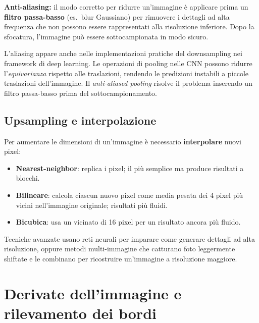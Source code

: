 \documentclass[12pt, a4paper]{report}
\begin{document}
\textbf{Anti-aliasing:} il modo corretto per ridurre un'immagine è applicare prima
un \textbf{filtro passa-basso} (es.\ blur Gaussiano) per rimuovere i dettagli ad
alta frequenza che non possono essere rappresentati alla risoluzione inferiore.  Dopo
la sfocatura, l'immagine può essere sottocampionata in modo sicuro.

\begin{notebox}
L'aliasing appare anche nelle implementazioni pratiche del downsampling nei framework
di deep learning.  Le operazioni di pooling nelle CNN possono ridurre
l'\emph{equivarianza} rispetto alle traslazioni, rendendo le predizioni instabili a
piccole traslazioni dell'immagine.  Il \emph{anti-aliased pooling} risolve il
problema inserendo un filtro passa-basso prima del sottocampionamento.
\end{notebox}

\subsection{Upsampling e interpolazione}

Per aumentare le dimensioni di un'immagine è necessario \textbf{interpolare} nuovi
pixel:
\begin{itemize}
  \item \textbf{Nearest-neighbor}: replica i pixel; il più semplice ma produce
        risultati a blocchi.
  \item \textbf{Bilineare}: calcola ciascun nuovo pixel come media pesata dei 4
        pixel più vicini nell'immagine originale; risultati più fluidi.
  \item \textbf{Bicubica}: usa un vicinato di 16 pixel per un risultato ancora più
        fluido.
\end{itemize}

\begin{notebox}
Tecniche avanzate usano reti neurali per imparare come generare dettagli ad alta
risoluzione, oppure metodi multi-immagine che catturano foto leggermente shiftate e
le combinano per ricostruire un'immagine a risoluzione maggiore.
\end{notebox}

\section{Derivate dell'immagine e rilevamento dei bordi}
\end{document}
